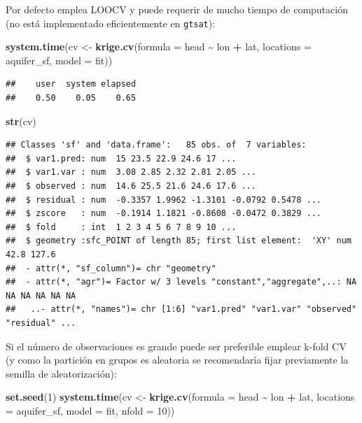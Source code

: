 \documentclass[
]{book}
\newenvironment{Shaded}{\begin{snugshade}}{\end{snugshade}}
\newcommand{\AttributeTok}[1]{\textcolor[rgb]{0.13,0.29,0.53}{#1}}
\newcommand{\DecValTok}[1]{\textcolor[rgb]{0.00,0.00,0.81}{#1}}
\newcommand{\FunctionTok}[1]{\textcolor[rgb]{0.13,0.29,0.53}{\textbf{#1}}}
\newcommand{\NormalTok}[1]{#1}
\newcommand{\OtherTok}[1]{\textcolor[rgb]{0.56,0.35,0.01}{#1}}
\newcommand{\SpecialCharTok}[1]{\textcolor[rgb]{0.81,0.36,0.00}{\textbf{#1}}}
\theoremstyle{break}
\theoremstyle{definition}
\theoremstyle{definition}
\theoremstyle{definition}
\theoremstyle{definition}
\theoremstyle{remark}
\begin{document}
Por defecto emplea LOOCV y puede requerir de mucho tiempo de computación (no está implementado eficientemente en \texttt{gtsat}):

\begin{Shaded}
\begin{Highlighting}[]
\FunctionTok{system.time}\NormalTok{(cv }\OtherTok{\textless{}{-}} \FunctionTok{krige.cv}\NormalTok{(}\AttributeTok{formula =}\NormalTok{ head }\SpecialCharTok{\textasciitilde{}}\NormalTok{ lon }\SpecialCharTok{+}\NormalTok{ lat, }\AttributeTok{locations =}\NormalTok{ aquifer\_sf,}
                           \AttributeTok{model =}\NormalTok{ fit))}
\end{Highlighting}
\end{Shaded}

\begin{verbatim}
##    user  system elapsed 
##    0.50    0.05    0.65
\end{verbatim}

\begin{Shaded}
\begin{Highlighting}[]
\FunctionTok{str}\NormalTok{(cv)}
\end{Highlighting}
\end{Shaded}

\begin{verbatim}
## Classes 'sf' and 'data.frame':   85 obs. of  7 variables:
##  $ var1.pred: num  15 23.5 22.9 24.6 17 ...
##  $ var1.var : num  3.08 2.85 2.32 2.81 2.05 ...
##  $ observed : num  14.6 25.5 21.6 24.6 17.6 ...
##  $ residual : num  -0.3357 1.9962 -1.3101 -0.0792 0.5478 ...
##  $ zscore   : num  -0.1914 1.1821 -0.8608 -0.0472 0.3829 ...
##  $ fold     : int  1 2 3 4 5 6 7 8 9 10 ...
##  $ geometry :sfc_POINT of length 85; first list element:  'XY' num  42.8 127.6
##  - attr(*, "sf_column")= chr "geometry"
##  - attr(*, "agr")= Factor w/ 3 levels "constant","aggregate",..: NA NA NA NA NA NA
##   ..- attr(*, "names")= chr [1:6] "var1.pred" "var1.var" "observed" "residual" ...
\end{verbatim}

Si el número de observaciones es grande puede ser preferible emplear k-fold CV (y como la partición en grupos es aleatoria se recomendaría fijar previamente la semilla de aleatorización):

\begin{Shaded}
\begin{Highlighting}[]
\FunctionTok{set.seed}\NormalTok{(}\DecValTok{1}\NormalTok{)}
\FunctionTok{system.time}\NormalTok{(cv }\OtherTok{\textless{}{-}} \FunctionTok{krige.cv}\NormalTok{(}\AttributeTok{formula =}\NormalTok{ head }\SpecialCharTok{\textasciitilde{}}\NormalTok{ lon }\SpecialCharTok{+}\NormalTok{ lat, }\AttributeTok{locations =}\NormalTok{ aquifer\_sf,}
                           \AttributeTok{model =}\NormalTok{ fit, }\AttributeTok{nfold =} \DecValTok{10}\NormalTok{))}
\end{Highlighting}
\end{Shaded}
\end{document}
